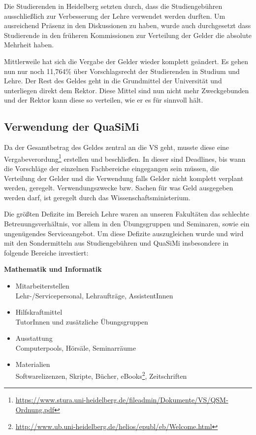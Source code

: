 Die Studierenden in Heidelberg setzten durch, dass die Studiengebühren
ausschließlich zur Verbesserung der Lehre verwendet werden durften. Um
ausreichend Präsenz in den Diskussionen zu haben, wurde auch durchgesetzt dass
Studierende in den früheren Kommissionen zur Verteilung der Gelder die absolute Mehrheit
haben. 

Mittlerweile hat sich die Vergabe der Gelder wieder komplett geändert. Es gehen
nun nur noch 11,764\% über Vorschlagsrecht der Studierenden in Studium und
Lehre. Der Rest des Geldes geht in die Grundmittel der Universität und
unterliegen direkt dem Rektor. Diese Mittel sind nun nicht mehr Zweckgebunden
und der Rektor kann diese so verteilen, wie er es für sinnvoll hält. 


\subsection*{Verwendung der QuaSiMi}

Da der Gesamtbetrag des Geldes zentral an die VS geht, musste diese eine
Vergabeverordung\footnote{\url{https://www.stura.uni-heidelberg.de/fileadmin/Dokumente/VS/QSM-Ordnung.pdf}}
erstellen und beschließen. In dieser sind Deadlines, bis wann die Vorschläge
der einzelnen Fachbereiche eingegangen sein müssen, die Verteilung der Gelder
und die Verwendung falls Gelder nicht komplett verplant werden, geregelt.
Verwendungszwecke bzw. Sachen für was Geld ausgegeben werden darf, ist geregelt
durch das Wissenschaftsministerium.

Die größten Defizite im Bereich Lehre waren an unseren Fakultäten das schlechte
Betreuungsverhältnis, vor allem in den Übungsgruppen und Seminaren, sowie ein
ungenügendes Serviceangebot. Um diese Defizite auszugleichen wurde und wird mit
den Sondermitteln aus Studiengebühren und QuaSiMi insbesondere in folgende
Bereiche investiert:

\vspace{5mm}
\textbf{Mathematik und Informatik}
\begin{itemize}
 \item {Mitarbeiterstellen}\\Lehr-/Servicepersonal, Lehraufträge, AssistentInnen
\item {Hilfskraftmittel}\\ TutorInnen und zusätzliche Übungsgruppen
\item {Ausstattung}\\ Computerpools, Hörsäle, Seminarräume
\item {Materialien}\\ Softwarelizenzen, Skripte, Bücher, eBooks\footnote{\url{http://www.ub.uni-heidelberg.de/helios/epubl/eb/Welcome.html}}, Zeitschriften
\end{itemize}

